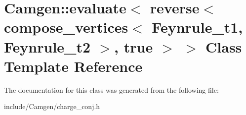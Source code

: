 \hypertarget{a00180}{}\section{Camgen\+:\+:evaluate$<$ reverse$<$ compose\+\_\+vertices$<$ Feynrule\+\_\+t1, Feynrule\+\_\+t2 $>$, true $>$ $>$ Class Template Reference}
\label{a00180}


The documentation for this class was generated from the following file\+:\begin{DoxyCompactItemize}
\item 
include/\+Camgen/charge\+\_\+conj.\+h\end{DoxyCompactItemize}
